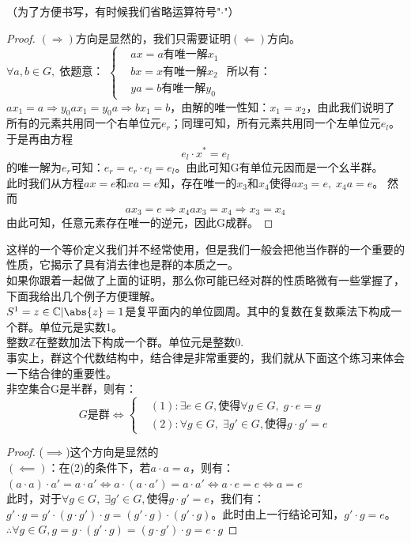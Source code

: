 （为了方便书写，有时候我们省略运算符号"$\cdot$"）
\begin{proof}
$(\Rightarrow)$方向是显然的，我们只需要证明$(\Leftarrow)$方向。\\
$\forall a,b\in G,\;$依题意：
$\left\{
\begin{aligned}
&ax=a\text{有唯一解}x_1\\
&bx=x\text{有唯一解}x_2\\
&ya=b\text{有唯一解}y_0
\end{aligned}\right.$
所以有：$ax_1=a\Rightarrow y_0ax_1=y_0a\Rightarrow bx_1=b$，由解的唯一性知：$x_1=x_2$，由此我们说明了所有的元素共用同一个右单位元$e_{r}$；同理可知，所有元素共用同一个左单位元$e_{l}$。于是再由方程
\[
e_{l}\cdot x^{*}=e_{l}
\]
的唯一解为$e_{r}$可知：$e_{r}=e_{r}\cdot e_{l}=e_{l}$。由此可知G有单位元因而是一个幺半群。\\
此时我们从方程$ax=e$和$xa=e$知，存在唯一的$x_3$和$x_4$使得$ax_3=e,\; x_4a=e$。
然而
\[
ax_3=e\Rightarrow x_4ax_3=x_4\Rightarrow x_3=x_4
\]
由此可知，任意元素存在唯一的逆元，因此G成群。
\end{proof}
这样的一个等价定义我们并不经常使用，但是我们一般会把他当作群的一个重要的性质，它揭示了具有消去律也是群的本质之一。\\
如果你跟着一起做了上面的证明，那么你可能已经对群的性质略微有一些掌握了，下面我给出几个例子方便理解。\\
$S^1={z\in \mathbb{C}|\abs{z}=1}$是复平面内的单位圆周。其中的复数在复数乘法下构成一个群。单位元是实数1。\\
整数$\mathbb{Z}$在整数加法下构成一个群。单位元是整数0.\\
事实上，群这个代数结构中，结合律是非常重要的，我们就从下面这个练习来体会一下结合律的重要性。\\
非空集合G是半群，则有：
\[
G\text{是群}\iff \left\{
\begin{aligned}
&(1):\exists e\in G,\text{使得}\forall g\in G,\; g\cdot e=g\\
&(2):\forall g\in G,\; \exists g'\in G,\text{使得}g\cdot g'=e
\end{aligned}\right.
\]
\begin{proof}
($\implies$)这个方向是显然的\\
$(\impliedby)$：在(2)的条件下，若$a\cdot a=a$，则有：$(a\cdot a)\cdot a'=a\cdot a'\iff a\cdot (a\cdot a')=a\cdot a'\iff a
\cdot e=e\iff a=e$\\
此时，对于$\forall g\in G,\; \exists g'\in G,\text{使得}g\cdot g'=e$，我们有：$g'\cdot g=g'\cdot (g\cdot g')\cdot g=(g'\cdot g)\cdot (g'\cdot g)$。此时由上一行结论可知，$g'\cdot g=e$。\\
$\therefore \forall g\in G,g=g\cdot (g'\cdot g)=(g\cdot g')\cdot g=e\cdot g$
\end{proof}


